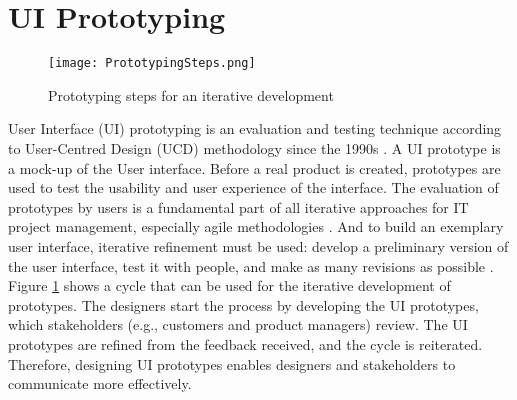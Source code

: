 \section{UI Prototyping}
\label{background:section:uiprototyping}
\begin{figure}[htbp!]
  \centering    
  \texttt{[image: PrototypingSteps.png]}
  \caption[Steps of Prototyping]{Prototyping steps for an iterative development}
  \label{fig:background:stepsPrototyping}
\end{figure}
User Interface (UI) prototyping is an evaluation and testing technique according to User-Centred Design (UCD) methodology since the 1990s \cite{article:prototyping:preece}.
A UI prototype is a mock-up of the User interface.
Before a real product is created, prototypes are used to test the usability and user experience of the interface.
The evaluation of prototypes by users is a fundamental part of all iterative approaches for IT project management, especially agile methodologies \cite{article:prototyping:schwaber}.
And to build an exemplary user interface, iterative refinement must be used: develop a preliminary version of the user interface, test it with people, and make as many revisions as possible \cite{article:prototyping:gould}.
Figure \ref{fig:background:stepsPrototyping} shows a cycle that can be used for the iterative development of prototypes.
The designers start the process by developing the UI prototypes, which stakeholders (e.g., customers and product managers) review. The UI prototypes are refined from the feedback received, and the cycle is reiterated.
Therefore, designing UI prototypes enables designers and stakeholders to communicate more effectively.

